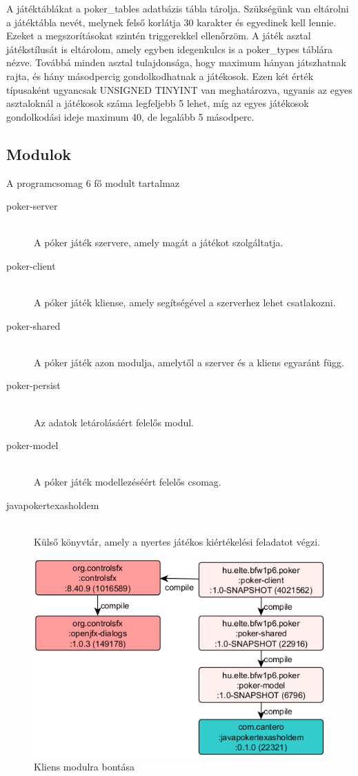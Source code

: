A játéktáblákat a poker\_tables adatbázis tábla tárolja. Szükségünk van eltárolni a játéktábla nevét, melynek felső korlátja 30 karakter és egyedinek kell lennie. Ezeket a megszorításokat szintén triggerekkel ellenőrzöm. A játék asztal játékstílusát is eltárolom, amely egyben idegenkulcs is a poker\_types táblára nézve. Továbbá minden asztal tulajdonsága, hogy maximum hányan játszhatnak rajta, és hány másodpercig gondolkodhatnak a játékosok. Ezen két érték típusaként ugyancsak UNSIGNED TINYINT van meghatározva, ugyanis az egyes asztaloknál a játékosok száma legfeljebb 5 lehet, míg az egyes játékosok gondolkodási ideje maximum 40, de legalább 5 másodperc.

\subsection{Modulok}
A programcsomag 6 fő modult tartalmaz
\begin{description}
  \item[poker-server] \hfill \\
  A póker játék szervere, amely magát a játékot szolgáltatja.
  \item[poker-client] \hfill \\
  A póker játék kliense, amely segítségével a szerverhez lehet csatlakozni.
  \item[poker-shared] \hfill \\
   A póker játék azon modulja, amelytől a szerver és a kliens egyaránt függ.
   \item[poker-persist] \hfill \\
   Az adatok letárolásáért felelős modul.
   \item[poker-model] \hfill \\
   A póker játék modellezéséért felelős csomag.
   \item[javapokertexasholdem] \hfill \\
   Külső könyvtár, amely a nyertes játékos kiértékelési feladatot végzi.
\end{description}
\begin{figure}[h!]
	\caption{Kliens modulra bontása}
	\label{fig:client_modul}
	\centering
	\includegraphics{user-documentation/images/poker-client-deps.png}
\end{figure}
